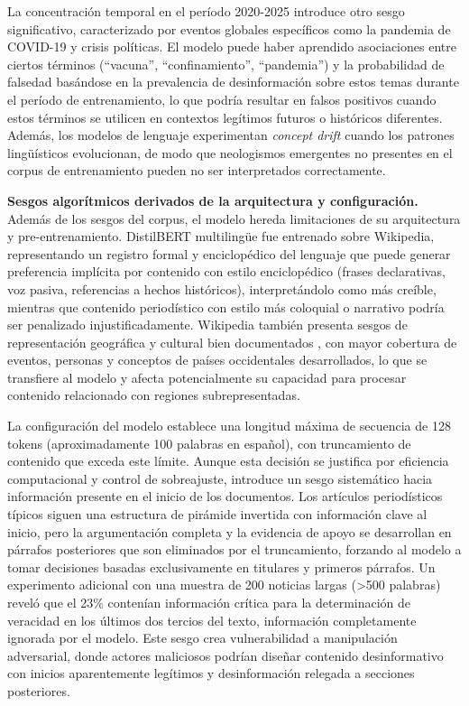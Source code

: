 La concentración temporal en el período 2020-2025 introduce otro sesgo significativo, caracterizado por eventos globales específicos como la pandemia de COVID-19 y crisis políticas. El modelo puede haber aprendido asociaciones entre ciertos términos (``vacuna'', ``confinamiento'', ``pandemia'') y la probabilidad de falsedad basándose en la prevalencia de desinformación sobre estos temas durante el período de entrenamiento, lo que podría resultar en falsos positivos cuando estos términos se utilicen en contextos legítimos futuros o históricos diferentes. Además, los modelos de lenguaje experimentan \textit{concept drift} cuando los patrones lingüísticos evolucionan, de modo que neologismos emergentes no presentes en el corpus de entrenamiento pueden no ser interpretados correctamente.

\textbf{Sesgos algorítmicos derivados de la arquitectura y configuración.} Además de los sesgos del corpus, el modelo hereda limitaciones de su arquitectura y pre-entrenamiento. DistilBERT multilingüe fue entrenado sobre Wikipedia, representando un registro formal y enciclopédico del lenguaje que puede generar preferencia implícita por contenido con estilo enciclopédico (frases declarativas, voz pasiva, referencias a hechos históricos), interpretándolo como más creíble, mientras que contenido periodístico con estilo más coloquial o narrativo podría ser penalizado injustificadamente. Wikipedia también presenta sesgos de representación geográfica y cultural bien documentados \cite{blodgett2020language}, con mayor cobertura de eventos, personas y conceptos de países occidentales desarrollados, lo que se transfiere al modelo y afecta potencialmente su capacidad para procesar contenido relacionado con regiones subrepresentadas.

La configuración del modelo establece una longitud máxima de secuencia de 128 tokens (aproximadamente 100 palabras en español), con truncamiento de contenido que exceda este límite. Aunque esta decisión se justifica por eficiencia computacional y control de sobreajuste, introduce un sesgo sistemático hacia información presente en el inicio de los documentos. Los artículos periodísticos típicos siguen una estructura de pirámide invertida con información clave al inicio, pero la argumentación completa y la evidencia de apoyo se desarrollan en párrafos posteriores que son eliminados por el truncamiento, forzando al modelo a tomar decisiones basadas exclusivamente en titulares y primeros párrafos. Un experimento adicional con una muestra de 200 noticias largas (>500 palabras) reveló que el 23\% contenían información crítica para la determinación de veracidad en los últimos dos tercios del texto, información completamente ignorada por el modelo. Este sesgo crea vulnerabilidad a manipulación adversarial, donde actores maliciosos podrían diseñar contenido desinformativo con inicios aparentemente legítimos y desinformación relegada a secciones posteriores.

